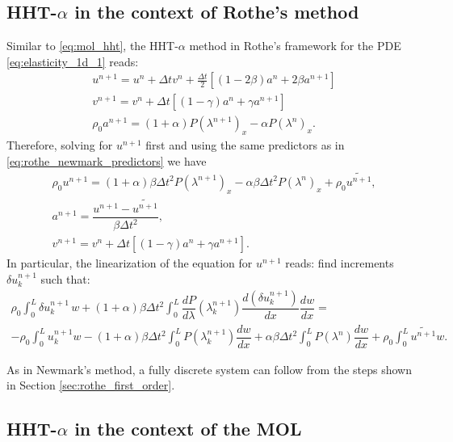 \documentclass{sfuthesis}
\numberwithin{equation}{section}
\numberwithin{figure}{chapter}
\numberwithin{table}{chapter}
\theoremstyle{definition}
\newcommand{\der}[2]{\dfrac{d #1}{d #2}}
\begin{document}
\subsection{HHT-$\alpha$ in the context of Rothe's method} \label{sec:rothe_hht}

Similar to \eqref{eq:mol_hht}, the HHT-$\alpha$ method in Rothe's framework for the PDE \eqref{eq:elasticity_1d_1} reads:
\begin{subequations} \label{eq:rothe_hht}
    \begin{align}
        &u^{n+1} = u^n + \Delta t v^n + \frac{\Delta t}{2} \left[ (1-2\beta) a^n + 2\beta a^{n+1} \right] \\
	    &v^{n+1} = v^n + \Delta t \left[ (1-\gamma) a^n + \gamma a^{n+1} \right] \\
	    & \rho_0 a^{n+1} = (1+\alpha) P(\lambda^{n+1})_x - \alpha P(\lambda^n)_x.
    \end{align}
\end{subequations}
Therefore, solving for $u^{n+1}$ first and using the same predictors as in \eqref{eq:rothe_newmark_predictors} we have
\begin{subequations}
    \begin{align}
        & \rho_0 u^{n+1} = (1+\alpha) \beta \Delta t^2 P(\lambda^{n+1})_x - \alpha \beta \Delta t^2 P(\lambda^n)_x + \rho_0 \widetilde{u^{n+1}}, \\
	    & a^{n+1} = \dfrac{u^{n+1} - \widetilde{u^{n+1}}}{\beta \Delta t^2}, \\
	    & v^{n+1} = v^n + \Delta t \left[ (1-\gamma) a^n + \gamma a^{n+1} \right].
    \end{align}
\end{subequations}
In particular, the linearization of the equation for $u^{n+1}$ reads: find increments $\delta u_k^{n+1}$ such that:
\begin{multline} 
	\rho_0 \int_0^L \delta u_k^{n+1} \, w + (1+\alpha)\beta \Delta t^2 \int_0^L \der{P}{\lambda}(\lambda_k^{n+1}) \der{(\delta u_k^{n+1})}{x} \der{w}{x} = \\
	-\rho_0 \int_0^L u_k^{n+1} w - (1+\alpha)\beta \Delta t^2 \int_0^L P(\lambda_k^{n+1})  \der{w}{x} + \alpha \beta \Delta t^2 \int_0^L P(\lambda^n) \der{w}{x} + \rho_0 \int_0^L \widetilde{u^{n+1}} w.
\end{multline}

As in Newmark's method, a fully discrete system can follow from the steps shown in Section \ref{sec:rothe_first_order}.

\subsection{HHT-$\alpha$ in the context of the MOL} \label{sec:mol_hht}
\end{document}
